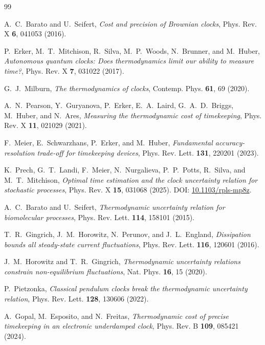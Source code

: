 \documentclass[aps,pre,reprint,amsmath,amssymb,floatfix,nofootinbib]{revtex4-2}
\begin{document}
\begin{thebibliography}{99}

A.~C.~Barato and U.~Seifert,
\emph{Cost and precision of Brownian clocks},
Phys. Rev. X \textbf{6}, 041053 (2016).

P.~Erker, M.~T.~Mitchison, R.~Silva, M.~P.~Woods, N.~Brunner, and M.~Huber,
\emph{Autonomous quantum clocks: Does thermodynamics limit our ability to measure time?},
Phys. Rev. X \textbf{7}, 031022 (2017).

G.~J.~Milburn,
\emph{The thermodynamics of clocks},
Contemp. Phys. \textbf{61}, 69 (2020).

A.~N.~Pearson, Y.~Guryanova, P.~Erker, E.~A.~Laird, G.~A.~D.~Briggs, M.~Huber, and N.~Ares,
\emph{Measuring the thermodynamic cost of timekeeping},
Phys. Rev. X \textbf{11}, 021029 (2021).

F.~Meier, E.~Schwarzhans, P.~Erker, and M.~Huber,
\emph{Fundamental accuracy-resolution trade-off for timekeeping devices},
Phys. Rev. Lett. \textbf{131}, 220201 (2023).

K.~Prech, G.~T.~Landi, F.~Meier, N.~Nurgalieva, P.~P.~Potts, R.~Silva, and M.~T.~Mitchison,
\emph{Optimal time estimation and the clock uncertainty relation for stochastic processes},
Phys. Rev. X \textbf{15}, 031068 (2025).
DOI: \href{https://doi.org/10.1103/rpls-mp8z}{10.1103/rpls-mp8z}.

A.~C.~Barato and U.~Seifert,
\emph{Thermodynamic uncertainty relation for biomolecular processes},
Phys. Rev. Lett. \textbf{114}, 158101 (2015).

T.~R.~Gingrich, J.~M.~Horowitz, N.~Perunov, and J.~L.~England,
\emph{Dissipation bounds all steady-state current fluctuations},
Phys. Rev. Lett. \textbf{116}, 120601 (2016).

J.~M.~Horowitz and T.~R.~Gingrich,
\emph{Thermodynamic uncertainty relations constrain non-equilibrium fluctuations},
Nat. Phys. \textbf{16}, 15 (2020).

P.~Pietzonka,
\emph{Classical pendulum clocks break the thermodynamic uncertainty relation},
Phys. Rev. Lett. \textbf{128}, 130606 (2022).

A.~Gopal, M.~Esposito, and N.~Freitas,
\emph{Thermodynamic cost of precise timekeeping in an electronic underdamped clock},
Phys. Rev. B \textbf{109}, 085421 (2024).


\end{thebibliography}
\end{document}
